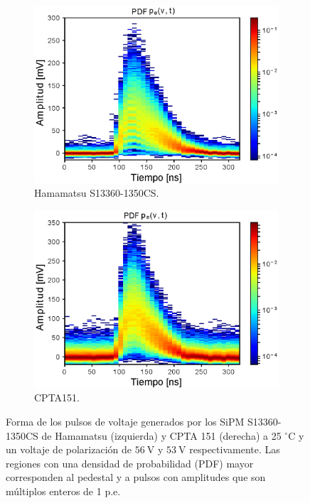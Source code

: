 \begin{figure}[h!]
     \centering
     \begin{subfigure}[b]{0.49\textwidth}
         \centering
         \includegraphics[width=1.1\textwidth]{Images/PDF_1350CS.eps}
         \caption{Hamamatsu S13360-1350CS.}
         \label{fig:PDF_1350CS}
     \end{subfigure}
     \begin{subfigure}[b]{0.49\textwidth}
         \centering
         \includegraphics[width=1.1\textwidth]{Images/PDF_CPTA151.eps}
         \caption{CPTA151.}
         \label{fig:PDF_CPTA}
     \end{subfigure}
        \caption{Forma de los pulsos de voltaje generados por los SiPM S13360-1350CS de Hamamatsu (izquierda) y CPTA 151 (derecha) a 25 $^\circ$C y un voltaje de polarización de $56~\mbox{V}$ y $53~\mbox{V}$ respectivamente. Las regiones con una densidad de probabilidad (PDF) mayor corresponden al pedestal y a pulsos con amplitudes que son múltiplos enteros de 1 p.e.}
        \label{fig:PDF}
\end{figure}

